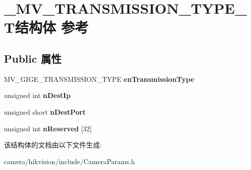 \hypertarget{struct___m_v___t_r_a_n_s_m_i_s_s_i_o_n___t_y_p_e___t}{}\section{\+\_\+\+M\+V\+\_\+\+T\+R\+A\+N\+S\+M\+I\+S\+S\+I\+O\+N\+\_\+\+T\+Y\+P\+E\+\_\+\+T结构体 参考}
\label{struct___m_v___t_r_a_n_s_m_i_s_s_i_o_n___t_y_p_e___t}
\subsection*{Public 属性}
\begin{DoxyCompactItemize}
\item 
\mbox{\label{struct___m_v___t_r_a_n_s_m_i_s_s_i_o_n___t_y_p_e___t_a8ecf73405902ca872760851569aac677}} 
M\+V\+\_\+\+G\+I\+G\+E\+\_\+\+T\+R\+A\+N\+S\+M\+I\+S\+S\+I\+O\+N\+\_\+\+T\+Y\+PE {\bfseries en\+Transmission\+Type}
\item 
\mbox{\label{struct___m_v___t_r_a_n_s_m_i_s_s_i_o_n___t_y_p_e___t_aeca238b80839ca5bae88a136bf653d05}} 
unsigned int {\bfseries n\+Dest\+Ip}
\item 
\mbox{\label{struct___m_v___t_r_a_n_s_m_i_s_s_i_o_n___t_y_p_e___t_ae6ab52fe8268a1831f8d739033e714d1}} 
unsigned short {\bfseries n\+Dest\+Port}
\item 
\mbox{\label{struct___m_v___t_r_a_n_s_m_i_s_s_i_o_n___t_y_p_e___t_ac92f4fbc62b2ecc175ad0bb2b02dfd1c}} 
unsigned int {\bfseries n\+Reserved} \mbox{[}32\mbox{]}
\end{DoxyCompactItemize}


该结构体的文档由以下文件生成\+:\begin{DoxyCompactItemize}
\item 
camera/hikvision/include/Camera\+Params.\+h\end{DoxyCompactItemize}
